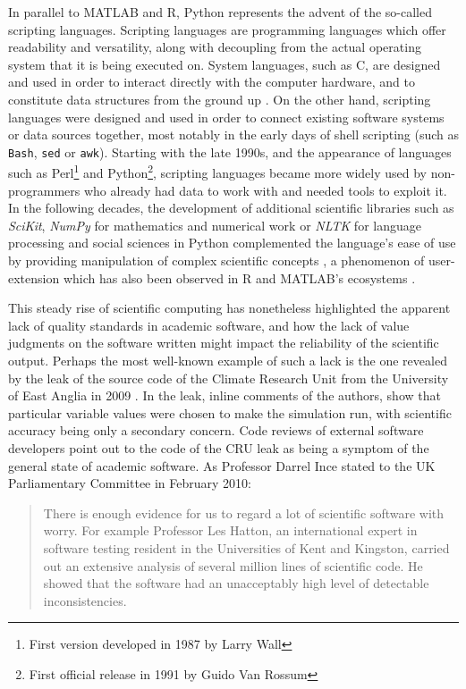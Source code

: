 In parallel to MATLAB and R, Python represents the advent of the so-called scripting languages. Scripting languages are programming  languages which offer readability and versatility, along with decoupling from the actual operating system that it is being executed on. System languages, such as C, are designed and used in order to interact directly with the computer hardware, and to constitute data structures from the ground up \citep{ousterhout_scripting_1998}. On the other hand, scripting languages were designed and used in order to connect existing software systems or data sources together, most notably in the early days of shell scripting (such as \lstinline{Bash}, \lstinline{sed} or \lstinline{awk}). Starting with the late 1990s, and the appearance of languages such as Perl\footnote{First version developed in 1987 by Larry Wall} and Python\footnote{First official release in 1991 by Guido Van Rossum}, scripting languages became more widely used by non-programmers who already had data to work with and needed tools to exploit it. In the following decades, the development of additional scientific libraries such as \emph{SciKit}, \emph{NumPy} for mathematics and numerical work or \emph{NLTK} for language processing and social sciences in Python complemented the language's ease of use by providing manipulation of complex scientific concepts \citep{millman_python_2011}, a phenomenon of user-extension which has also been observed in R and MATLAB's ecosystems \citep{moler_history_2020}.

This steady rise of scientific computing has nonetheless highlighted the apparent lack of quality standards in academic software, and how the lack of value judgments on the software written might impact the reliability of the scientific output. Perhaps the most well-known example of such a lack is the one revealed by the leak of the source code of the Climate Research Unit from the University of East Anglia in 2009 \citep{merali_computational_2010}. In the leak, inline comments of the authors, show that particular variable values were chosen to make the simulation run, with scientific accuracy being only a secondary concern. Code reviews of external software developers point out to the code of the CRU leak as being a symptom of the general state of academic software. As Professor Darrel Ince stated to the UK Parliamentary Committee in February 2010:

\begin{quote}
  There is enough evidence for us to regard a lot of scientific software with worry. For example Professor Les Hatton, an international expert in software testing resident in the Universities of Kent and Kingston, carried out an extensive analysis of several million lines of scientific code. He showed that the software had an unacceptably high level of detectable inconsistencies. \citep{committee_disclosure_2010}
\end{quote}

